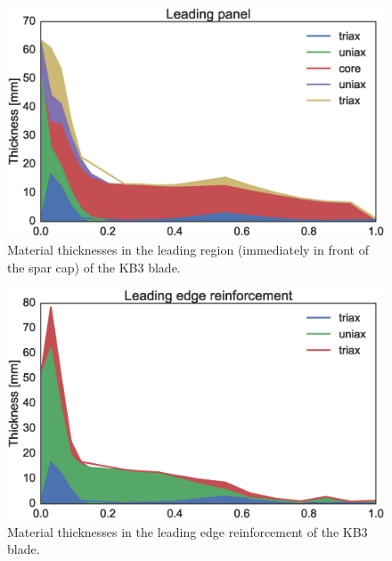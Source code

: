\begin{figure}[!ht]
\begin{center}
	\includegraphics[width=.85\linewidth]{figures/KB3_region06.eps}
\end{center}
\caption{Material thicknesses in the leading region (immediately in front of the spar cap) of the KB3 blade.}
\label{fig:matstackr06}
\end{figure}

\begin{figure}[!ht]
\begin{center}
	\includegraphics[width=.85\linewidth]{figures/KB3_region07.eps}
\end{center}
\caption{Material thicknesses in the leading edge reinforcement of the KB3 blade.}
\label{fig:KB3matstackr07}
\end{figure}




